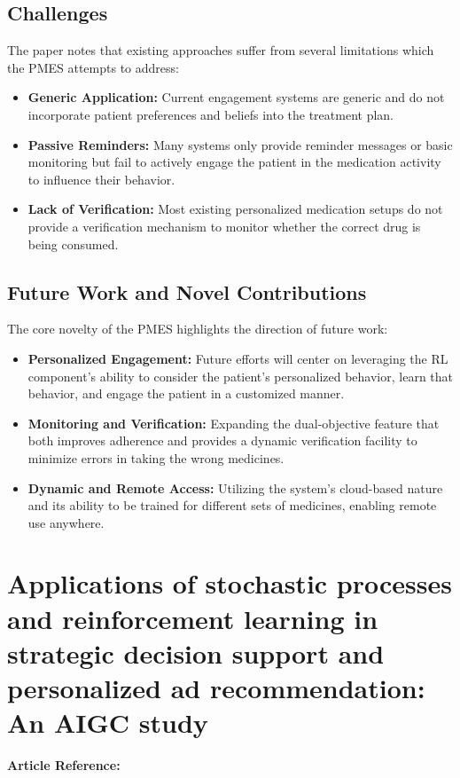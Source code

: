 \subsection*{Challenges}
The paper notes that existing approaches suffer from several limitations which the PMES attempts to address:
\begin{itemize}
    \item \textbf{Generic Application:} Current engagement systems are generic and do not incorporate patient preferences and beliefs into the treatment plan.
    \item \textbf{Passive Reminders:} Many systems only provide reminder messages or basic monitoring but fail to actively engage the patient in the medication activity to influence their behavior.
    \item \textbf{Lack of Verification:} Most existing personalized medication setups do not provide a verification mechanism to monitor whether the correct drug is being consumed.
\end{itemize}

\subsection*{Future Work and Novel Contributions}
The core novelty of the PMES highlights the direction of future work:
\begin{itemize}
    \item \textbf{Personalized Engagement:} Future efforts will center on leveraging the RL component's ability to consider the patient's personalized behavior, learn that behavior, and engage the patient in a customized manner.
    \item \textbf{Monitoring and Verification:} Expanding the dual-objective feature that both improves adherence and provides a dynamic verification facility to minimize errors in taking the wrong medicines.
    \item \textbf{Dynamic and Remote Access:} Utilizing the system's cloud-based nature and its ability to be trained for different sets of medicines, enabling remote use anywhere.
\end{itemize}


\section{Applications of stochastic processes and reinforcement learning in strategic decision support and personalized ad recommendation: An AIGC study}
\textbf{Article Reference:} \cite{DOI105425427552721}
